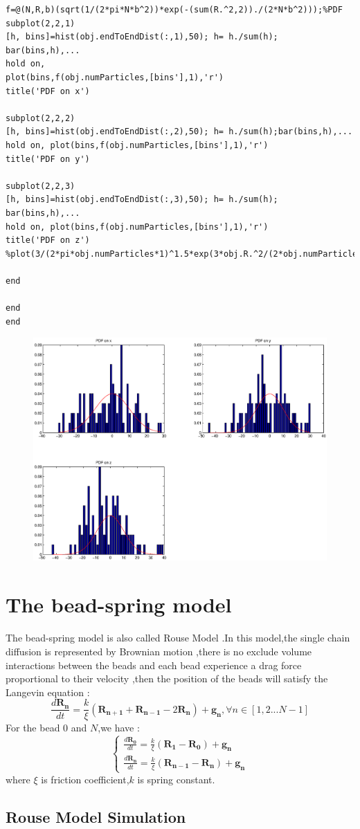 \documentclass{article}
\begin{document}
\begin{lstlisting}
f=@(N,R,b)(sqrt(1/(2*pi*N*b^2))*exp(-(sum(R.^2,2))./(2*N*b^2)));%PDF 
subplot(2,2,1)
[h, bins]=hist(obj.endToEndDist(:,1),50); h= h./sum(h); bar(bins,h),...
hold on, 
plot(bins,f(obj.numParticles,[bins'],1),'r')
title('PDF on x')

subplot(2,2,2)
[h, bins]=hist(obj.endToEndDist(:,2),50); h= h./sum(h);bar(bins,h),...
hold on, plot(bins,f(obj.numParticles,[bins'],1),'r')
title('PDF on y')

subplot(2,2,3)
[h, bins]=hist(obj.endToEndDist(:,3),50); h= h./sum(h); bar(bins,h),...
hold on, plot(bins,f(obj.numParticles,[bins'],1),'r')
title('PDF on z')
%plot(3/(2*pi*obj.numParticles*1)^1.5*exp(3*obj.R.^2/(2*obj.numParticles*1)))

end

end
end 

\end{lstlisting}
\begin{figure}[H]
	\includegraphics[width=6.2in]{PDF.eps} 
	 
	 \end{figure}
	 \section{The bead-spring model}
	 \paragraph{}
	 The bead-spring model is also called Rouse Model .In this model,the single chain diffusion is represented by Brownian motion ,there is no exclude volume 	interactions between the beads and each bead experience a drag force proportional to their velocity ,then the position of the beads will satisfy the Langevin equation :
	 \begin{equation}
	 \frac{d\bm{R_n}}{dt}=\frac{k}{\xi}(\bm{R_{n+1}}+\bm{R_{n-1}}-2\bm{R_{n}})+\bm{g_n}, \forall n \in [1,2...N-1]
	 \end{equation}
	 For the bead $0$ and $N$,we have :
	 \[
	 \begin{cases}
	\frac{d\bm{R_0}}{dt}=\frac{k}{\xi}(\bm{R_{1}}-\bm{R_{0}})+\bm{g_n}\\
	\frac{d\bm{R_n}}{dt}=\frac{k}{\xi}(\bm{R_{n-1}}-\bm{R_{n}})+\bm{g_n}
	 \end{cases}
	 \]
	 where $\xi$ is friction coefficient,$k$ is spring constant.
	 \subsection{Rouse Model Simulation}
	 
\end{document}
